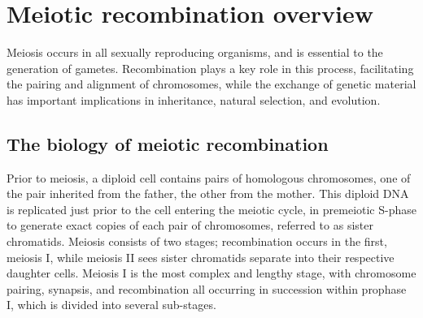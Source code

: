 
\section{Meiotic recombination overview}

Meiosis occurs in all sexually reproducing organisms, and is essential to the generation of gametes.
Recombination plays a key role in this process, facilitating the pairing and alignment of chromosomes, while the exchange of genetic material has important implications in inheritance, natural selection, and evolution.



\subsection{The biology of meiotic recombination}

Prior to meiosis, a diploid cell contains pairs of homologous chromosomes, one of the pair inherited from the father, the other from the mother.
This diploid DNA is replicated just prior to the cell entering the meiotic cycle, in premeiotic S-phase\cite{Bell2002} to generate exact copies of each pair of chromosomes, referred to as sister chromatids.
Meiosis consists of two stages; recombination occurs in the first, meiosis I, while meiosis II sees sister chromatids separate into their respective daughter cells.
Meiosis I is the most complex and lengthy stage, with chromosome pairing, synapsis, and recombination all occurring in succession within prophase I, which is  divided into several sub-stages.

